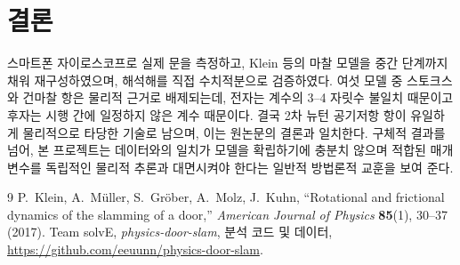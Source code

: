 \documentclass[11pt,letterpaper]{article}
\begin{document}
\section{결론}
스마트폰 자이로스코프로 실제 문을 측정하고, Klein 등의 마찰 모델을 중간 단계까지 채워
재구성하였으며, 해석해를 직접 수치적분으로 검증하였다. 여섯 모델 중 스토크스와 건마찰 항은
물리적 근거로 배제되는데, 전자는 계수의 3{--}4 자릿수 불일치 때문이고 후자는 시행 간에
일정하지 않은 계수 때문이다. 결국 2차 뉴턴 공기저항 항이 유일하게 물리적으로 타당한 기술로
남으며, 이는 원논문의 결론과 일치한다. 구체적 결과를 넘어, 본 프로젝트는 데이터와의 일치가
모델을 확립하기에 충분치 않으며 적합된 매개변수를 독립적인 물리적 추론과 대면시켜야 한다는
일반적 방법론적 교훈을 보여 준다.

\begin{thebibliography}{9}
 P.~Klein, A.~M\"uller, S.~Gr\"ober, A.~Molz, J.~Kuhn,
``Rotational and frictional dynamics of the slamming of a door,''
\textit{American Journal of Physics} \textbf{85}(1), 30--37 (2017).
 Team solvE, \textit{physics-door-slam}, 분석 코드 및 데이터,
\url{https://github.com/eeuunn/physics-door-slam}.
\end{thebibliography}
\end{document}
